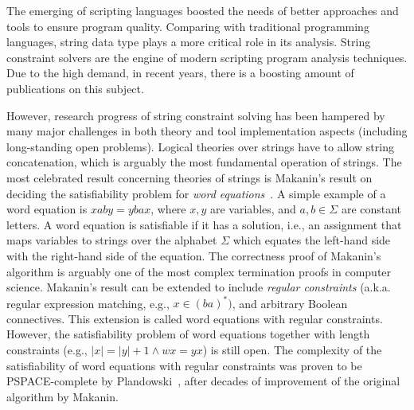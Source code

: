 
The emerging of scripting languages boosted the needs of better approaches and tools to ensure program quality.
Comparing with traditional programming languages, string data type plays a more critical role in its analysis.
String constraint solvers are the engine of modern scripting program analysis techniques. 
Due to the high demand, in recent years, there is a boosting amount of publications on this subject.

However, research progress of string constraint solving has been hampered by many major challenges in both theory and tool implementation aspects (including long-standing open problems). 
Logical theories over strings have to allow string concatenation, which is arguably the most fundamental operation of strings. 
The most celebrated result concerning theories of strings is Makanin’s result on deciding the satisfiability problem for \emph{word equations}~\cite{makanin77}.
A simple example of a word equation is $xaby = ybax$, where $x, y$ are variables, and $a, b \in \Sigma$ are constant letters. 
A word equation is satisfiable if it has a solution, i.e., an assignment that maps variables to strings over the alphabet $\Sigma$ which equates the left-hand side with the right-hand side of the equation.
The correctness proof of Makanin’s algorithm is arguably one of the most complex termination proofs in computer science. 
Makanin’s result can be extended to include \emph{regular constraints} (a.k.a. regular expression matching, e.g., $x \in (ba)^*)$, and arbitrary Boolean connectives.
This extension is called word equations with regular constraints. 
However, the satisfiability problem of word equations together with length constraints (e.g., $|x|=|y|+1 \wedge wx=yx$) is still open.
The complexity of the satisfiability of word equations with regular constraints was proven to be PSPACE-complete by Plandowski~\cite{plandowski99}, after decades of improvement of the original algorithm by Makanin.

